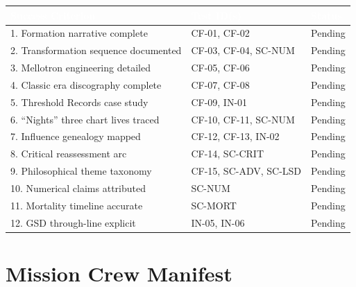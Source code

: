 \documentclass[11pt,letterpaper]{article}
\newcommand{\tableheader}[1]{\textbf{\sffamily\textcolor{white}{#1}}}
\begin{document}
\begin{center}
\begin{tabularx}{\textwidth}{XL{3.5cm}C{1.8cm}}
\toprule
{}
\tableheader{Success Criterion} & \tableheader{Test ID(s)} & \tableheader{Status} \\
. Formation narrative complete & CF-01, CF-02 & Pending \\
2. Transformation sequence documented & CF-03, CF-04, SC-NUM & Pending \\
3. Mellotron engineering detailed & CF-05, CF-06 & Pending \\
4. Classic era discography complete & CF-07, CF-08 & Pending \\
5. Threshold Records case study & CF-09, IN-01 & Pending \\
6. ``Nights'' three chart lives traced & CF-10, CF-11, SC-NUM & Pending \\
7. Influence genealogy mapped & CF-12, CF-13, IN-02 & Pending \\
8. Critical reassessment arc & CF-14, SC-CRIT & Pending \\
9. Philosophical theme taxonomy & CF-15, SC-ADV, SC-LSD & Pending \\
10. Numerical claims attributed & SC-NUM & Pending \\
11. Mortality timeline accurate & SC-MORT & Pending \\
12. GSD through-line explicit & IN-05, IN-06 & Pending \\
\bottomrule
\end{tabularx}
\end{center}

\section{Mission Crew Manifest}
\end{document}
